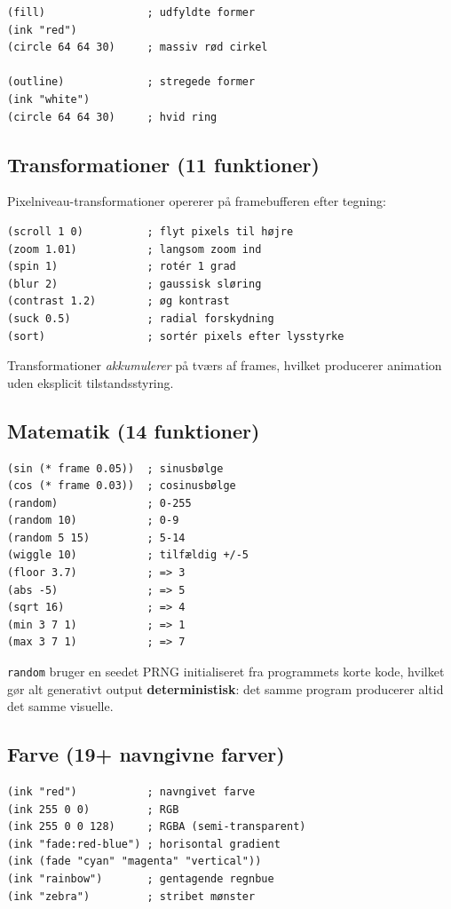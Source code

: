 \documentclass[10pt,letterpaper,twocolumn]{article}
\begin{document}
\begin{lstlisting}
(fill)                ; udfyldte former
(ink "red")
(circle 64 64 30)     ; massiv rød cirkel

(outline)             ; stregede former
(ink "white")
(circle 64 64 30)     ; hvid ring
\end{lstlisting}

\subsection{Transformationer (11 funktioner)}

Pixelniveau-transformationer opererer på framebufferen efter tegning:

\begin{lstlisting}
(scroll 1 0)          ; flyt pixels til højre
(zoom 1.01)           ; langsom zoom ind
(spin 1)              ; rotér 1 grad
(blur 2)              ; gaussisk sløring
(contrast 1.2)        ; øg kontrast
(suck 0.5)            ; radial forskydning
(sort)                ; sortér pixels efter lysstyrke
\end{lstlisting}

Transformationer \emph{akkumulerer} på tværs af frames, hvilket producerer animation uden eksplicit tilstandsstyring.

\subsection{Matematik (14 funktioner)}

\begin{lstlisting}
(sin (* frame 0.05))  ; sinusbølge
(cos (* frame 0.03))  ; cosinusbølge
(random)              ; 0-255
(random 10)           ; 0-9
(random 5 15)         ; 5-14
(wiggle 10)           ; tilfældig +/-5
(floor 3.7)           ; => 3
(abs -5)              ; => 5
(sqrt 16)             ; => 4
(min 3 7 1)           ; => 1
(max 3 7 1)           ; => 7
\end{lstlisting}

\texttt{random} bruger en seedet PRNG initialiseret fra programmets korte kode, hvilket gør alt generativt output \textbf{deterministisk}: det samme program producerer altid det samme visuelle.

\subsection{Farve (19+ navngivne farver)}

\begin{lstlisting}
(ink "red")           ; navngivet farve
(ink 255 0 0)         ; RGB
(ink 255 0 0 128)     ; RGBA (semi-transparent)
(ink "fade:red-blue") ; horisontal gradient
(ink (fade "cyan" "magenta" "vertical"))
(ink "rainbow")       ; gentagende regnbue
(ink "zebra")         ; stribet mønster
\end{lstlisting}
\end{document}
